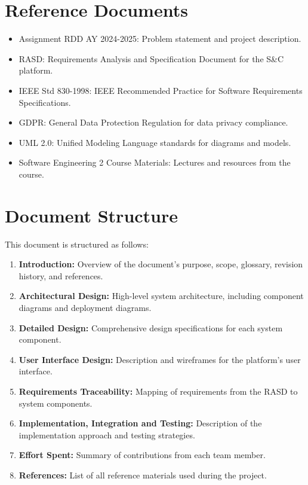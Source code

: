 \section{Reference Documents}\label{sec:reference-documents}
\begin{itemize}
    \item Assignment RDD AY 2024-2025: Problem statement and project description.
    \item RASD: Requirements Analysis and Specification Document for the S\&C platform.
    \item IEEE Std 830-1998: IEEE Recommended Practice for Software Requirements Specifications.
    \item GDPR: General Data Protection Regulation for data privacy compliance.
    \item UML 2.0: Unified Modeling Language standards for diagrams and models.
    \item Software Engineering 2 Course Materials: Lectures and resources from the course.
\end{itemize}

\section{Document Structure}\label{sec:document-structure}
This document is structured as follows:
\begin{enumerate}
    \item \textbf{Introduction:} Overview of the document's purpose, scope, glossary, revision history, and references.
    \item \textbf{Architectural Design:} High-level system architecture, including component diagrams and deployment diagrams.
    \item \textbf{Detailed Design:} Comprehensive design specifications for each system component.
    \item \textbf{User Interface Design:} Description and wireframes for the platform’s user interface.
    \item \textbf{Requirements Traceability:} Mapping of requirements from the RASD to system components.
    \item \textbf{Implementation, Integration and Testing:} Description of the implementation approach and testing strategies.
    \item \textbf{Effort Spent:} Summary of contributions from each team member.
    \item \textbf{References:} List of all reference materials used during the project.
\end{enumerate}

